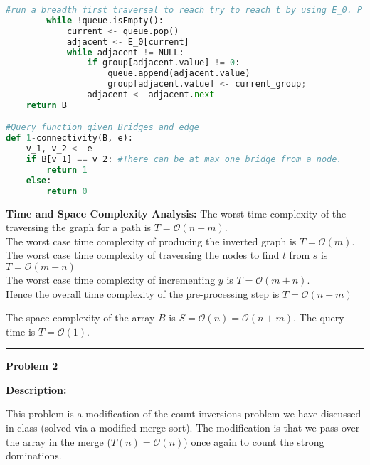 \documentclass[10pt, a4paper]{article}
\newcommand{\BigO}{\mathcal{O}}
\begin{document}
\begin{lstlisting}[language=Python,caption= 1-connectivity]
        #run a breadth first traversal to reach try to reach t by using E_0. Places where it cannot are identified as edges.
        while !queue.isEmpty():
            current <- queue.pop()
            adjacent <- E_0[current]
            while adjacent != NULL:
                if group[adjacent.value] != 0:
                    queue.append(adjacent.value)
                    group[adjacent.value] <- current_group;
                adjacent <- adjacent.next
    return B

#Query function given Bridges and edge
def 1-connectivity(B, e):
    v_1, v_2 <- e 
    if B[v_1] == v_2: #There can be at max one bridge from a node.
        return 1
    else:
        return 0
\end{lstlisting}

\textbf{Time and Space Complexity Analysis:}
The worst time complexity of the traversing the graph for a path is $T = \BigO(n+m)$.\\
The worst case time complexity of producing the inverted graph is $T = \BigO(m)$.\\
The worst case time complexity of traversing the nodes to find $t$ from $s$ is $T = \BigO(m+n)$\\
The worst case time complexity of incrementing $y$ is $T= \BigO(m+n)$.\\
Hence the overall time complexity of the pre-processing step is $T = \BigO(n+m)$

The space complexity of the array $B$ is $S = \BigO(n) = \BigO(n+m)$. The query time is $T = \BigO(1)$.

\rule{\textwidth}{0.8pt}
\vspace{5pt}


\large{\textbf{Problem 2}}
\normalsize

\textbf{Description:}

This problem is a modification of the count inversions problem we have discussed in class (solved via a modified merge sort). The modification is that we pass over the array in the merge ($T(n)=\BigO(n)$) once again to count the strong dominations.
\end{document}
